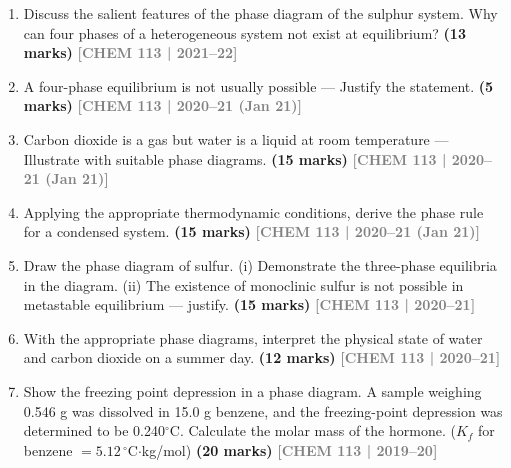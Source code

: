 \documentclass[12pt,a3paper]{article}
\newcommand{\yr}[1]{\hfill\textcolor{gray}{\small\textbf{[#1]}}}
\newcommand{\mk}[1]{\textcolor{orange!70!black}{\small\textbf{(#1 marks)}}}
\begin{document}
\begin{enumerate}
\item Discuss the salient features of the phase diagram of the sulphur system. Why can four phases of a heterogeneous system not exist at equilibrium? \mk{13}
\yr{CHEM 113 | 2021--22}




\item A four-phase equilibrium is not usually possible --- Justify the statement. \mk{5}
\yr{CHEM 113 | 2020--21 (Jan 21)}




\item Carbon dioxide is a gas but water is a liquid at room temperature --- Illustrate with suitable phase diagrams. \mk{15}
\yr{CHEM 113 | 2020--21 (Jan 21)}





\item Applying the appropriate thermodynamic conditions, derive the phase rule for a condensed system. \mk{15}
\yr{CHEM 113 | 2020--21 (Jan 21)}




\item Draw the phase diagram of sulfur. (i) Demonstrate the three-phase equilibria in the diagram. (ii) The existence of monoclinic sulfur is not possible in metastable equilibrium --- justify. \mk{15}
\yr{CHEM 113 | 2020--21}




\item With the appropriate phase diagrams, interpret the physical state of water and carbon dioxide on a summer day. \mk{12}
\yr{CHEM 113 | 2020--21}





\item Show the freezing point depression in a phase diagram. A sample weighing 0.546 g was dissolved in 15.0 g benzene, and the freezing-point depression was determined to be 0.240$^\circ$C. Calculate the molar mass of the hormone. ($K_f$ for benzene $= 5.12\,^\circ$C$\cdot$kg/mol) \mk{20}
\yr{CHEM 113 | 2019--20}


\end{enumerate}
\end{document}
